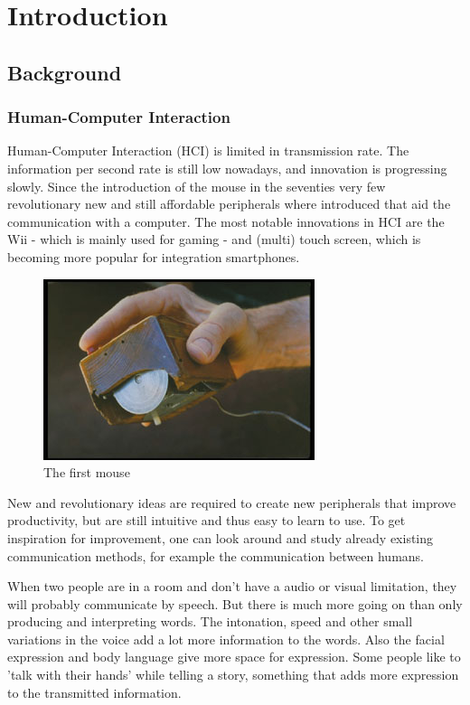 
\chapter{Introduction}
\label{ch:intro}

\section{Background}
\subsection*{Human-Computer Interaction}
Human-Computer Interaction (HCI) is limited in transmission rate. The information per second rate is still low nowadays, and innovation is progressing slowly. Since the introduction of the mouse in the seventies very few revolutionary new and still affordable peripherals where introduced that aid the communication with a computer. The most notable innovations in HCI are the Wii - which is mainly used for gaming - and (multi) touch screen, which is becoming more popular for integration smartphones.

\begin{figure}[htbp]
	\center{}
	\label{fig:mouse}
	\includegraphics[width=0.3\linewidth]{figures/mouse.jpg}
	\caption{The first mouse}
\end{figure}

New and revolutionary ideas are required to create new peripherals that improve productivity, but are still intuitive and thus easy to learn to use. To get inspiration for improvement, one can look around and study already existing communication methods, for example the communication between humans. 

When two people are in a room and don't have a audio or visual limitation, they will probably communicate by speech. But there is much more going on than only producing and interpreting words. The intonation, speed and other small variations in the voice add a lot more information to the words. Also the facial expression and body language give more space for expression. Some people like to 'talk with their hands' while telling a story, something that adds more expression to the transmitted information.

